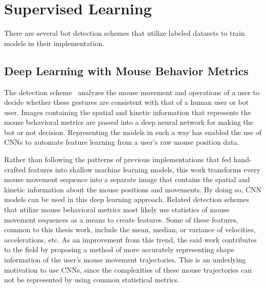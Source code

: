 
\section{Supervised Learning}\label{sec:supervised-learning}
There are several bot detection schemes that utilize labeled datasets to train models in their implementation.

\subsection{Deep Learning with Mouse Behavior Metrics}\label{subsec:deep-learning-with-mouse-behavior}
The detection scheme~\cite{deep_learning_detection_with_mouse_behavior} analyzes the mouse movement and operations of a user to decide whether these gestures are consistent with that of a human user or bot user.
Images containing the spatial and kinetic information that represents the mouse behavioral metrics are passed into a deep neural network for making the bot or not decision.
Representing the models in such a way has enabled the use of CNNs to automate feature learning from a user's raw mouse position data.

Rather than following the patterns of previous implementations that fed hand-crafted features into shallow machine learning models, this work transforms every mouse movement sequence into a separate image that contains the spatial and kinetic information about the mouse positions and movements.
By doing so, CNN models can be used in this deep learning approach.
Related detection schemes that utilize mouse behavioral metrics most likely use statistics of mouse movement sequences as a means to create features.
Some of these features, common to this thesis work, include the mean, median, or variance of velocities, accelerations, etc.
As an improvement from this trend, the said work contributes to the field by proposing a method of more accurately representing shape information of the user's mouse movement trajectories.
This is an underlying motivation to use CNNs, since the complexities of these mouse trajectories can not be represented by using common statistical metrics.

